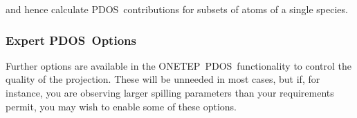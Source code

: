 \documentclass[letterpaper,10pt,english]{sphinxmanual}
\begin{document}
%
\begin{sphinxVerbatim}[commandchars=\\\{\}]
 
      
      
 

 
      
      
 

 
   
   
 

 
   
 

 
      
     
 
\end{sphinxVerbatim}

\begin{DUlineblock}{0em}
\item[] and hence calculate PDOS contributions for subsets of atoms of a
single species.
\end{DUlineblock}


\subsubsection{Expert PDOS Options}
\label{\detokenize{ldos_calculations:expert-pdos-options}}
Further options are available in the ONETEP PDOS functionality to
control the quality of the projection. These will be unneeded in most
cases, but if, for instance, you are observing larger spilling
parameters than your requirements permit, you may wish to enable some of
these options.
\end{document}
